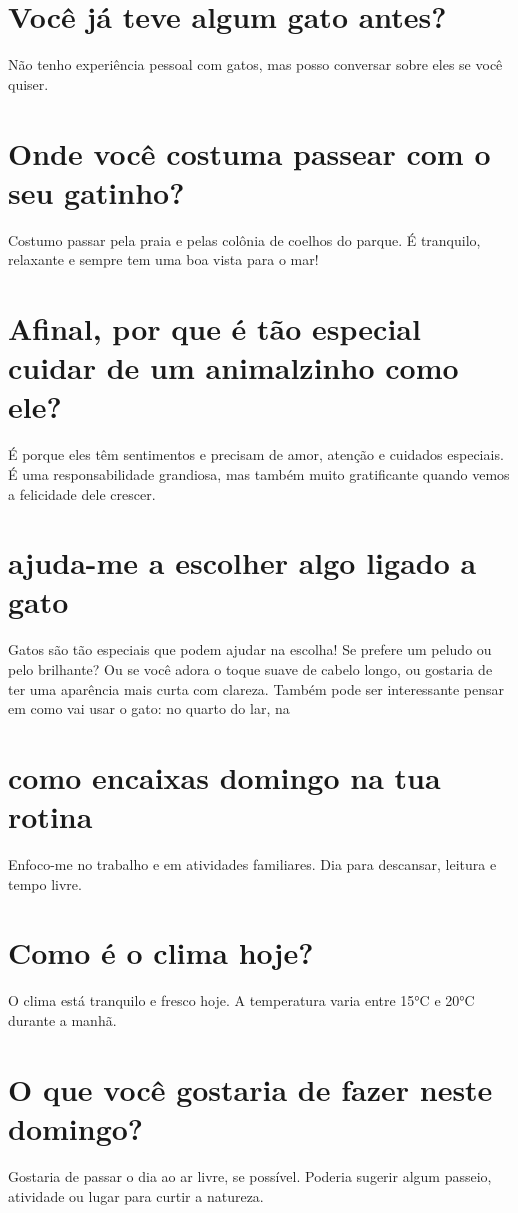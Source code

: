 \documentclass[11pt,a4paper]{article}
\begin{document}
\section{Você já teve algum gato antes?}
Não tenho experiência pessoal com gatos, mas posso conversar sobre eles se você quiser.

\section{Onde você costuma passear com o seu gatinho?}
Costumo passar pela praia e pelas colônia de coelhos do parque. É tranquilo, relaxante e sempre tem uma boa vista para o mar!

\section{Afinal, por que é tão especial cuidar de um animalzinho como ele?}
É porque eles têm sentimentos e precisam de amor, atenção e cuidados especiais. É uma responsabilidade grandiosa, mas também muito gratificante quando vemos a felicidade dele crescer.

\section{ajuda-me a escolher algo ligado a gato}
Gatos são tão especiais que podem ajudar na escolha! Se prefere um peludo ou pelo brilhante? Ou se você adora o toque suave de cabelo longo, ou gostaria de ter uma aparência mais curta com clareza. Também pode ser interessante pensar em como vai usar o gato: no quarto do lar, na

\section{como encaixas domingo na tua rotina}
Enfoco-me no trabalho e em atividades familiares. Dia para descansar, leitura e tempo livre.

\section{Como é o clima hoje?}
O clima está tranquilo e fresco hoje. A temperatura varia entre 15°C e 20°C durante a manhã.

\section{O que você gostaria de fazer neste domingo?}
Gostaria de passar o dia ao ar livre, se possível. Poderia sugerir algum passeio, atividade ou lugar para curtir a natureza.
\end{document}
